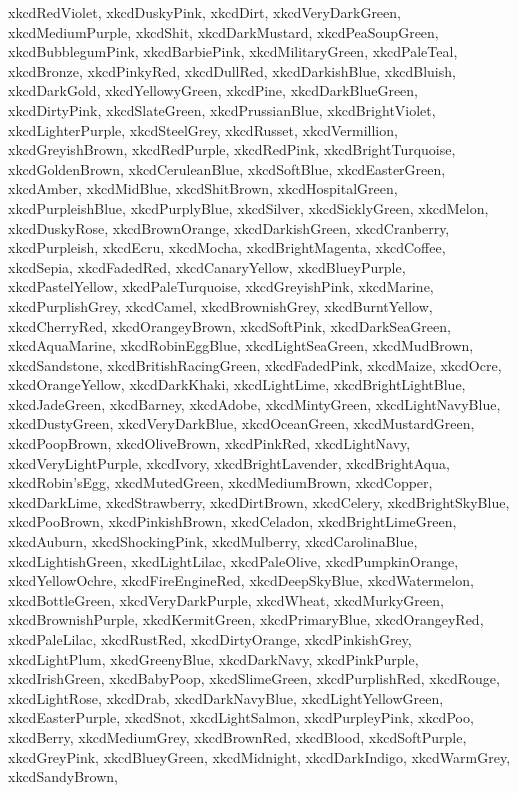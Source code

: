 \documentclass[12pt]{article}
\begin{document}
{{xkcdRedViolet,
xkcdDuskyPink,
xkcdDirt,
xkcdVeryDarkGreen,
xkcdMediumPurple,
xkcdShit,
xkcdDarkMustard,
xkcdPeaSoupGreen,
xkcdBubblegumPink,
xkcdBarbiePink,
xkcdMilitaryGreen,
xkcdPaleTeal,
xkcdBronze,
xkcdPinkyRed,
xkcdDullRed,
xkcdDarkishBlue,
xkcdBluish,
xkcdDarkGold,
xkcdYellowyGreen,
xkcdPine,
xkcdDarkBlueGreen,
xkcdDirtyPink,
xkcdSlateGreen,
xkcdPrussianBlue,
xkcdBrightViolet,
xkcdLighterPurple,
xkcdSteelGrey,
xkcdRusset,
xkcdVermillion,
xkcdGreyishBrown,
xkcdRedPurple,
xkcdRedPink,
xkcdBrightTurquoise,
xkcdGoldenBrown,
xkcdCeruleanBlue,
xkcdSoftBlue,
xkcdEasterGreen,
xkcdAmber,
xkcdMidBlue,
xkcdShitBrown,
xkcdHospitalGreen,
xkcdPurpleishBlue,
xkcdPurplyBlue,
xkcdSilver,
xkcdSicklyGreen,
xkcdMelon,
xkcdDuskyRose,
xkcdBrownOrange,
xkcdDarkishGreen,
xkcdCranberry,
xkcdPurpleish,
xkcdEcru,
xkcdMocha,
xkcdBrightMagenta,
xkcdCoffee,
xkcdSepia,
xkcdFadedRed,
xkcdCanaryYellow,
xkcdBlueyPurple,
xkcdPastelYellow,
xkcdPaleTurquoise,
xkcdGreyishPink,
xkcdMarine,
xkcdPurplishGrey,
xkcdCamel,
xkcdBrownishGrey,
xkcdBurntYellow,
xkcdCherryRed,
xkcdOrangeyBrown,
xkcdSoftPink,
xkcdDarkSeaGreen,
xkcdAquaMarine,
xkcdRobinEggBlue,
xkcdLightSeaGreen,
xkcdMudBrown,
xkcdSandstone,
xkcdBritishRacingGreen,
xkcdFadedPink,
xkcdMaize,
xkcdOcre,
xkcdOrangeYellow,
xkcdDarkKhaki,
xkcdLightLime,
xkcdBrightLightBlue,
xkcdJadeGreen,
xkcdBarney,
xkcdAdobe,
xkcdMintyGreen,
xkcdLightNavyBlue,
xkcdDustyGreen,
xkcdVeryDarkBlue,
xkcdOceanGreen,
xkcdMustardGreen,
xkcdPoopBrown,
xkcdOliveBrown,
xkcdPinkRed,
xkcdLightNavy,
xkcdVeryLightPurple,
xkcdIvory,
xkcdBrightLavender,
xkcdBrightAqua,
xkcdRobin'sEgg,
xkcdMutedGreen,
xkcdMediumBrown,
xkcdCopper,
xkcdDarkLime,
xkcdStrawberry,
xkcdDirtBrown,
xkcdCelery,
xkcdBrightSkyBlue,
xkcdPooBrown,
xkcdPinkishBrown,
xkcdCeladon,
xkcdBrightLimeGreen,
xkcdAuburn,
xkcdShockingPink,
xkcdMulberry,
xkcdCarolinaBlue,
xkcdLightishGreen,
xkcdLightLilac,
xkcdPaleOlive,
xkcdPumpkinOrange,
xkcdYellowOchre,
xkcdFireEngineRed,
xkcdDeepSkyBlue,
xkcdWatermelon,
xkcdBottleGreen,
xkcdVeryDarkPurple,
xkcdWheat,
xkcdMurkyGreen,
xkcdBrownishPurple,
xkcdKermitGreen,
xkcdPrimaryBlue,
xkcdOrangeyRed,
xkcdPaleLilac,
xkcdRustRed,
xkcdDirtyOrange,
xkcdPinkishGrey,
xkcdLightPlum,
xkcdGreenyBlue,
xkcdDarkNavy,
xkcdPinkPurple,
xkcdIrishGreen,
xkcdBabyPoop,
xkcdSlimeGreen,
xkcdPurplishRed,
xkcdRouge,
xkcdLightRose,
xkcdDrab,
xkcdDarkNavyBlue,
xkcdLightYellowGreen,
xkcdEasterPurple,
xkcdSnot,
xkcdLightSalmon,
xkcdPurpleyPink,
xkcdPoo,
xkcdBerry,
xkcdMediumGrey,
xkcdBrownRed,
xkcdBlood,
xkcdSoftPurple,
xkcdGreyPink,
xkcdBlueyGreen,
xkcdMidnight,
xkcdDarkIndigo,
xkcdWarmGrey,
xkcdSandyBrown,
}}
\end{document}
